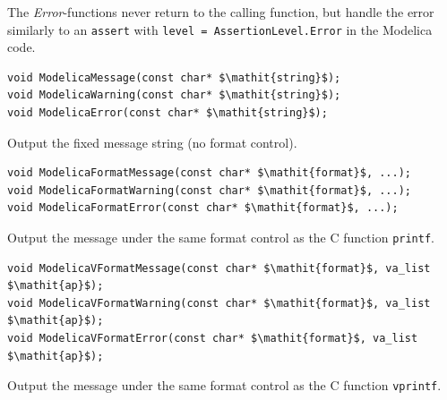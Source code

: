 The \emph{Error}-functions never return to the calling function, but handle the error similarly to an {\lstinline!assert!} with {\lstinline!level = AssertionLevel.Error!} in the Modelica code.

\begin{functiondefinition*}\label{modelica:ModelicaMessage-et-al}%
\begin{synopsis}[C]\begin{lstlisting}
void ModelicaMessage(const char* $\mathit{string}$);
void ModelicaWarning(const char* $\mathit{string}$);
void ModelicaError(const char* $\mathit{string}$);
\end{lstlisting}\end{synopsis}
\begin{semantics}
Output the fixed message string (no format control).
\end{semantics}
\end{functiondefinition*}

\begin{functiondefinition*}\label{modelica:ModelicaFormatMessage-et-al}%
\begin{synopsis}[C]
\begin{lstlisting}
void ModelicaFormatMessage(const char* $\mathit{format}$, ...);
void ModelicaFormatWarning(const char* $\mathit{format}$, ...);
void ModelicaFormatError(const char* $\mathit{format}$, ...);
\end{lstlisting}\end{synopsis}
\begin{semantics}
Output the message under the same format control as the C function {\lstinline[language=C]!printf!}.
\end{semantics}
\end{functiondefinition*}

\begin{functiondefinition*}\label{modelica:ModelicaVFormatMessage-et-al}%
\begin{synopsis}[C]\begin{lstlisting}
void ModelicaVFormatMessage(const char* $\mathit{format}$, va_list $\mathit{ap}$);
void ModelicaVFormatWarning(const char* $\mathit{format}$, va_list $\mathit{ap}$);
void ModelicaVFormatError(const char* $\mathit{format}$, va_list $\mathit{ap}$);
\end{lstlisting}\end{synopsis}
\begin{semantics}
Output the message under the same format control as the C function {\lstinline[language=C]!vprintf!}.
\end{semantics}
\end{functiondefinition*}

